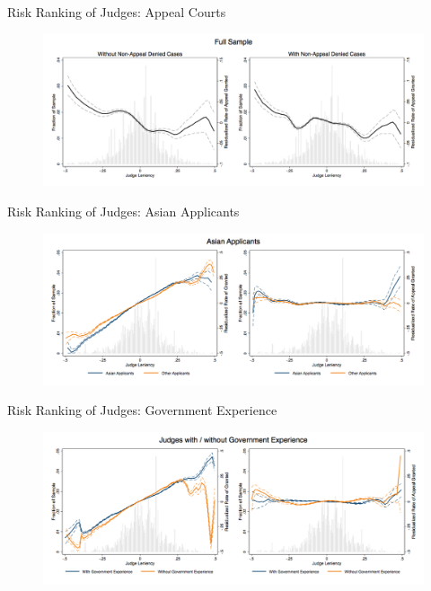 \begin{frame}{Risk Ranking of Judges: Appeal Courts}
    \begin{figure}
        \centering
        \includegraphics[height = 0.6 \textheight]{images/stage2comp_full.png}
    \end{figure}
\end{frame}

\begin{frame}{Risk Ranking of Judges: Asian Applicants}
    \begin{figure}
        \centering
        \includegraphics[height = 0.6 \textheight]{images/comp_asia.png}
    \end{figure}
\end{frame}

\begin{frame}{Risk Ranking of Judges: Government Experience}
    \begin{figure}
        \centering
        \includegraphics[height = 0.6 \textheight]{images/comp_govt_dum.png}
    \end{figure}
\end{frame}

